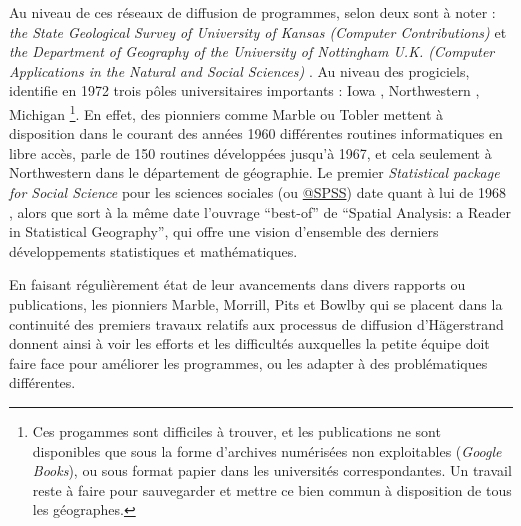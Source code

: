Au niveau de ces réseaux de diffusion de programmes, selon \textcite[20-21]{Greer1972} deux sont à noter : \textit{the State Geological Survey of University of Kansas (Computer Contributions)}  et \textit{ the Department of Geography of the University of Nottingham U.K. (Computer Applications in the Natural and Social Sciences) }. Au niveau des progiciels, \textcite[20-21]{Greer1972} identifie en 1972 trois pôles universitaires importants : Iowa \autocite{Wittick1968}, Northwestern \autocites{Marble1967, Marble1972b, Marble1972,Marble2010}, Michigan \autocite{Tobler1970c}\footnote{Ces progammes sont difficiles à trouver, et les publications ne sont disponibles que sous la forme d'archives numérisées non exploitables (\textit{Google Books}), ou sous format papier dans les universités correspondantes. Un travail reste à faire pour sauvegarder et mettre ce bien commun à disposition de tous les géographes.}. En effet, des pionniers comme Marble ou Tobler mettent à disposition dans le courant des années 1960 différentes routines informatiques en libre accès, \textcites[3]{Marble1967, Pitts1968} parle de 150 routines développées jusqu'à 1967, et cela seulement à Northwestern dans le département de géographie. Le premier \textit{Statistical package for Social Science} pour les sciences sociales (ou \href{http://www.spss.com.hk/corpinfo/history.htm}{@SPSS}) date quant à lui de 1968 \autocite{Barnes2011}, alors que sort à la même date l'ouvrage \foreignquote{english}{best-of} de \textcite{Berry1968} \foreignquote{english}{Spatial Analysis: a Reader in Statistical Geography}, qui offre une vision d'ensemble des derniers développements statistiques et mathématiques.

En faisant régulièrement état de leur avancements dans divers rapports ou publications, les pionniers Marble, Morrill, Pits et Bowlby \autocite{Pitts1963} qui se placent dans la continuité des premiers travaux relatifs aux processus de diffusion d'Hägerstrand \autocite{Hagerstrand1953, Hagerstrand1967a} donnent ainsi à voir les efforts et les difficultés auxquelles la petite équipe doit faire face pour améliorer les programmes, ou les adapter à des problématiques différentes.

